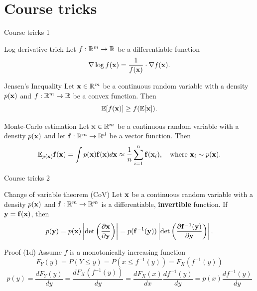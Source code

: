 \section{Course tricks}
\begin{frame}{Course tricks 1}
	\begin{block}{Log-derivative trick}
		Let $f: \mathbb{R}^m \rightarrow \mathbb{R}$ be a differentiable function
		\[
			\nabla \log f(\mathbf{x}) = \frac{1}{f(\mathbf{x})} \cdot \nabla f(\mathbf{x}).
		\]
		\vspace{-0.5cm}
	\end{block}
	\begin{block}{Jensen's Inequality}
		Let $\mathbf{x} \in \mathbb{R}^m$ be a continuous random variable with a density $p(\mathbf{x})$ and $f: \mathbb{R}^m \rightarrow \mathbb{R}$ be a convex function. Then
		\[
			\mathbb{E} [f(\mathbf{x})] \geq f(\mathbb{E}[\mathbf{x}]).
		\]
		\vspace{-0.7cm}
	\end{block}
	\begin{block}{Monte-Carlo estimation}
		Let $\mathbf{x} \in \mathbb{R}^m$ be a continuous random variable with a density $p(\mathbf{x})$ and let $\mathbf{f}: \mathbb{R}^m \rightarrow \mathbb{R}^d$ be a vector function. Then 
		\[
			\mathbb{E}_{p(\mathbf{x})} \mathbf{f}(\mathbf{x}) = \int p(\mathbf{x}) \mathbf{f}(\mathbf{x}) d \mathbf{x} \approx \frac{1}{n} \sum_{i=1}^n \mathbf{f}(\mathbf{x}_i), \quad 
			\text{where } \mathbf{x}_i \sim p(\mathbf{x}).
		\]
		\vspace{-0.4cm}
	\end{block}
\end{frame}
\begin{frame}{Course tricks 2}
	\begin{block}{Change of variable theorem (CoV)}
		Let $\mathbf{x}$ be a continuous random variable with a density $p(\mathbf{x})$ and $\mathbf{f}: \mathbb{R}^m \rightarrow \mathbb{R}^m$ is a differentiable, \textbf{invertible} function. If $\mathbf{y} = \mathbf{f}(\mathbf{x})$, then
		\[
			p(\mathbf{y}) = p(\mathbf{x}) \left|\det \left(  \frac{\partial \mathbf{x}}{\partial \mathbf{y}} \right) \right| = p(\mathbf{f}^{-1}(\mathbf{y})) \left|\det \left(  \frac{\partial \mathbf{f}^{-1}(\mathbf{y})}{\partial \mathbf{y}} \right) \right|.
		\]
		\vspace{-0.5cm}
	\end{block}
	\begin{block}{Proof (1d)}
		Assume $f$ is a monotonically increasing function
		\[
			F_Y(y) = P(Y \leq y) = P(x \leq f^{-1}(y)) = F_X(f^{-1}(y))
		\]
		\[
			p(y) = \frac{dF_Y(y)}{dy} = \frac{dF_X(f^{-1}(y))}{dy} = \frac{dF_X(x)}{dx} \frac{df^{-1}(y)}{dy} =  p(x) \frac{df^{-1}(y)}{dy}
		\]
	\end{block}
\end{frame}
